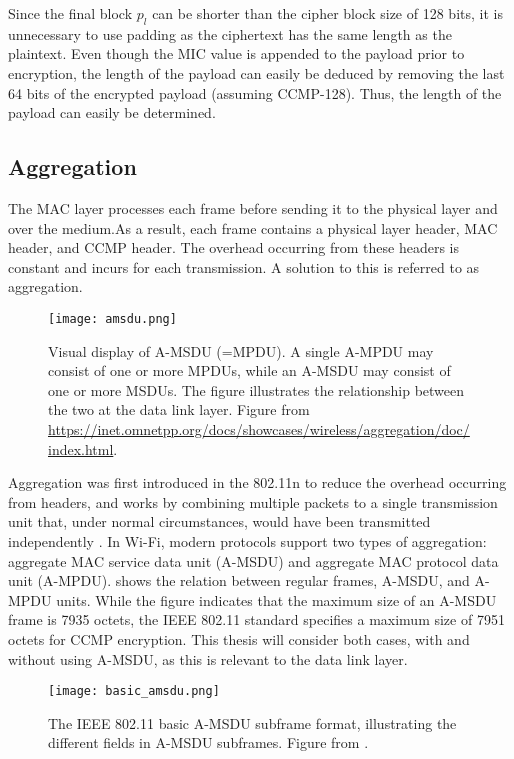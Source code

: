 Since the final block $p_{l}$ can be shorter than the cipher block size of 128 bits, it is unnecessary to use padding as the ciphertext has the same length as the plaintext. Even though the MIC value is appended to the payload prior to encryption, the length of the payload can easily be deduced by removing the last 64 bits of the encrypted payload (assuming CCMP-128). Thus, the length of the payload can easily be determined.

\subsection{Aggregation\label{subsec:aggregation-back}}

The MAC layer processes each frame before sending it to the physical layer and over the medium.As a result, each frame contains a physical layer header, MAC header, and CCMP header. The overhead occurring from these headers is constant and incurs for each transmission. A solution to this is referred to as aggregation.

\begin{figure}
\centering
\texttt{[image: amsdu.png]}
\caption{Visual display of A-MSDU (=MPDU). A single A-MPDU may consist of one or more MPDUs, while an A-MSDU may consist of one or more MSDUs. The figure illustrates the relationship between the two at the data link layer. Figure from \url{https://inet.omnetpp.org/docs/showcases/wireless/aggregation/doc/index.html}.}
\label{fig:ampdu_amsdu}
\end{figure}

Aggregation was first introduced in the 802.11n \cite{8693733} to reduce the overhead occurring from headers, and works by combining multiple packets to a single transmission unit that, under normal circumstances, would have been transmitted independently \cite{bhanage2017amsdu}. In Wi-Fi, modern protocols support two types of aggregation: aggregate MAC service data unit (A-MSDU) and aggregate MAC protocol data unit (A-MPDU).  shows the relation between regular frames, A-MSDU, and A-MPDU units. While the figure indicates that the maximum size of an A-MSDU frame is 7935 octets, the IEEE 802.11 standard \cite{9363693} specifies a maximum size of 7951 octets for CCMP encryption. This thesis will consider both cases, with and without using A-MSDU, as this is relevant to the data link layer.

\begin{figure}
\centering
\texttt{[image: basic\_amsdu.png]}
\caption{The IEEE 802.11 basic A-MSDU subframe format, illustrating the different fields in A-MSDU subframes. Figure from \cite{9363693}.}
\label{fig:basic_amsdu}
\end{figure}

